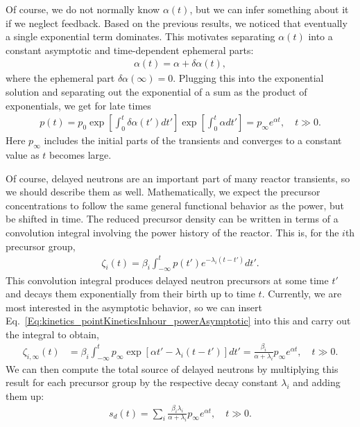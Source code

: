 Of course, we do not normally know $\alpha(t)$, but we can infer something about it if we neglect feedback. Based on the previous results, we noticed that eventually a single exponential term dominates. This motivates separating $\alpha(t)$ into a constant asymptotic and time-dependent ephemeral parts:
\begin{align}
  \alpha(t) = \alpha + \delta\alpha(t) ,
\end{align}
where the ephemeral part $\delta\alpha(\infty) = 0$. Plugging this into the exponential solution and separating out the exponential of a sum as the product of exponentials, we get for late times
\begin{align}
  p(t) = p_0 \exp \left[ \int_0^t \delta\alpha(t') dt' \right] \exp \left[ \int_0^t \alpha dt' \right] = p_\infty e^{\alpha t } , \quad t \gg 0 . \label{Eq:kinetics_pointKineticsInhour_powerAsymptotic}
\end{align}
Here $p_\infty$ includes the initial parts of the transients and converges to a constant value as $t$ becomes large.

Of course, delayed neutrons are an important part of many reactor transients, so we should describe them as well. Mathematically, we expect the precursor concentrations to follow the same general functional behavior as the power, but be shifted in time. The reduced precursor density can be written in terms of a convolution integral involving the power history of the reactor. This is, for the $i$th precursor group,
\begin{align}
  \zeta_i(t) = \beta_i \int_{-\infty}^t p(t') e^{-\lambda_i ( t - t' ) } dt' .
\end{align}
This convolution integral produces delayed neutron precursors at some time $t'$ and decays them exponentially from their birth up to time $t$. Currently, we are most interested in the asymptotic behavior, so we can insert Eq.~\eqref{Eq:kinetics_pointKineticsInhour_powerAsymptotic} into this and carry out the integral to obtain,
\begin{align}
  \zeta_{i,\infty}(t) 
  &= \beta_i \int_{-\infty}^t p_\infty \exp \left[ \alpha t' - \lambda_i ( t - t' ) \right] dt'
  = \frac{ \beta_i }{ \alpha + \lambda_i } p_\infty e^{\alpha t} , \quad t \gg 0. \label{Eq:kinetics_asymptoticReducedPrecursorConcentration}
\end{align}
We can then compute the total source of delayed neutrons by multiplying this result for each precursor group by the respective decay constant $\lambda_i$ and adding them up:
\begin{align}
  s_d(t) = \sum_i \frac{ \beta_i \lambda_i }{ \alpha + \lambda_i }  p_\infty e^{\alpha t} , \quad t \gg 0. \label{Eq:kinetics_asymptoticDelayedNeutronSource}
\end{align}

